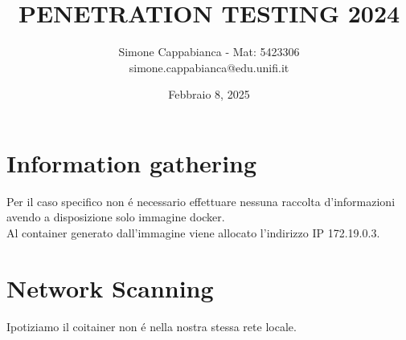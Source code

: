 \documentclass[12pt]{article}
\title{PENETRATION TESTING 2024}
\author{Simone Cappabianca - Mat: 5423306 \\  simone.cappabianca@edu.unifi.it}
\date{Febbraio 8, 2025}
\begin{document}
\maketitle
\newpage

\tableofcontents
\newpage

\section{Information gathering}
Per il caso specifico non \'{e} necessario effettuare nessuna raccolta 
d'informazioni avendo a disposizione solo immagine docker. \\
Al container generato dall'immagine viene allocato l'indirizzo IP 172.19.0.3.

\section{Network Scanning}
Ipotiziamo il coitainer non \'{e} nella nostra stessa rete locale.
\end{document}
